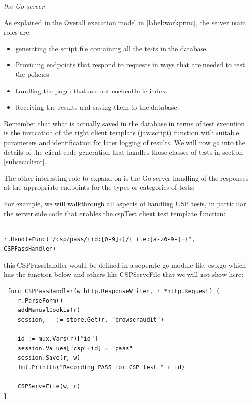 \emph{the Go server}

\label{label:servercode}

As explained in the Overall execution model in \ref{label:workprinc}, the server main roles are:
\begin{itemize}
 \item generating the script file containing all the tests in the database. 
 \item Providing endpoints that respond to requests in ways that are needed to test the policies. 
 \item handling the pages that are not cacheable ie index.
 \item Receiving the results and saving them to the database.
\end{itemize}

Remember that what is actually saved in the database in terms of test execution is the invocation of the right client template (javascript) function with
suitable parameters and identification for later logging of results.
We will now go into the details of the client code generation that handles those classes of tests in section \ref{subsec:client}.

The other interesting role to expand on is the Go server handling of the responses at the appropriate endpoints for the types or categories of tests;

For example, we will walkthrough all aspects of handling CSP tests, in particular the server side code that enables the cspTest client test template function:

\begin{verbatim}

r.HandleFunc("/csp/pass/{id:[0-9]+}/{file:[a-z0-9-]+}", CSPPassHandler)

\end{verbatim}

this CSPPassHandler would be defined in a seperate go module file, csp.go which has the function below and others like CSPServeFile that we will not show here:

\begin{verbatim}
 func CSPPassHandler(w http.ResponseWriter, r *http.Request) {
	r.ParseForm()
	addManualCookie(r)
	session, _ := store.Get(r, "browseraudit")

	id := mux.Vars(r)["id"]
	session.Values["csp"+id] = "pass"
	session.Save(r, w)
	fmt.Println("Recording PASS for CSP test " + id)

	CSPServeFile(w, r)
}
\end{verbatim}

